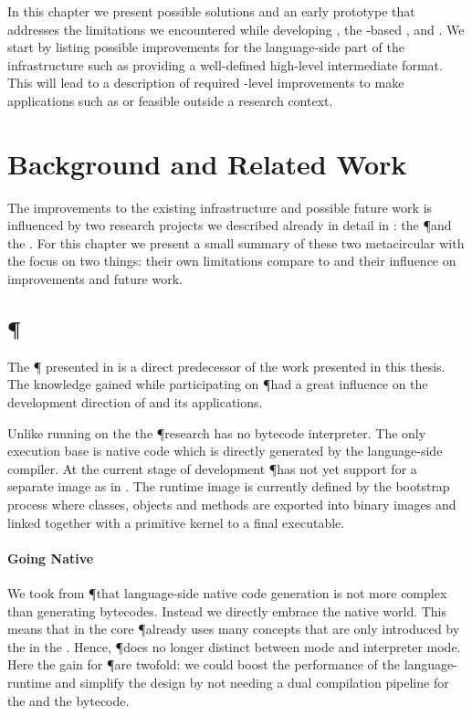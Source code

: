 In this chapter we present possible solutions and an early prototype \VM that addresses the limitations we encountered while developing \NB, the \B-based \FFI, \WF and \NBJ.
We start by listing possible improvements for the language-side part of the \B infrastructure such as providing a well-defined high-level intermediate format.
This will lead to a description of required \VM-level improvements to make applications such as \WF or \NBJ feasible outside a research context.


\section{Background and Related Work}
The improvements to the existing infrastructure \B and possible future work is influenced by two research projects we described already in detail in : the \P \VM and the \Klein \VM.
For this chapter we present a small summary of these two metacircular \VMs with the focus on two things: their own limitations compare to \B and their influence on improvements and future work.


\subsection{\P \VM}

The \P \VM \cite{Verw11a} presented in  is a direct predecessor of the work presented in this thesis.
The knowledge gained while participating on \P had a great influence on the development direction of \B and its applications.

Unlike \PH running on the \Cog \VM the \P research \VM has no bytecode interpreter.
The only execution base is native code which is directly generated by the language-side compiler.
At the current stage of development \P has not yet support for a separate image as in \PH.
The runtime image is currently defined by the bootstrap process where classes, objects and methods are exported into binary images and linked together with a primitive kernel to a final executable.

\paragraph{Going Native}
We took from \P that language-side native code generation is not more complex than generating bytecodes.
Instead we directly embrace the native world.
This means that in the core \P already uses many concepts that are only introduced by the \JIT in the \Cog \VM.
Hence, \P does no longer distinct between \JIT mode and interpreter mode.
Here the gain for \P are twofold: we could boost the performance of the language-runtime and simplify the design by not needing a dual compilation pipeline for the \JIT and the bytecode.

